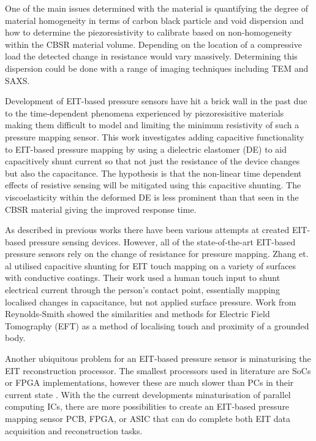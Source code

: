One of the main issues determined with the material is quantifying the degree of material homogeneity in terms of carbon black particle and void dispersion and how to determine the piezoresistivity to calibrate based on non-homogeneity within the CBSR material volume. Depending on the location of a compressive load the detected change in resistance would vary massively. Determining this dispersion could be done with a range of imaging techniques including TEM and SAXS.

Development of EIT-based pressure sensors have hit a brick wall in the past due to the time-dependent phenomena experienced by piezoresisitive materials making them difficult to model and limiting the minimum resistivity of such a pressure mapping sensor. This work investigates adding capacitive functionality to EIT-based pressure mapping by using a dielectric elastomer (DE) to aid capacitively shunt current so that not just the resistance of the device changes but also the capacitance. The hypothesis is that the non-linear time dependent effects of resistive sensing will be mitigated using this capacitive shunting. The viscoelasticity within the deformed DE is less prominent than that seen in the CBSR material giving the improved response time.

As described in previous works \cite{Ellingham2024} there have been various attempts at created EIT-based pressure sensing devices. However, all of the state-of-the-art EIT-based pressure sensors rely on the change of resistance for pressure mapping. Zhang et. al \cite{Zhang2017} utilised capacitive shunting for EIT touch mapping on a variety of surfaces with conductive coatings. Their work used a human touch input to shunt electrical current through the person's contact point, essentially mapping localised changes in capacitance, but not applied surface pressure. Work from Reynolds-Smith \cite{Reynoldssmith1995,Reynoldssmith1999} showed the similarities and methods for Electric Field Tomography (EFT) as a method of localising touch and proximity of a grounded body. 

Another ubiquitous problem for an EIT-based pressure sensor is minaturising the EIT reconstruction processor. The smallest processors used in literature are SoCs or FPGA implementations, however these are much slower than PCs in their current state \cite{ZamoraArellano2020,Kim2017,Takhti2019,Liu2019}. With the the current developments minaturisation of parallel computing ICs, there are more possibilities to create an EIT-based pressure mapping sensor PCB, FPGA, or ASIC that can do complete both EIT data acquisition and reconstruction tasks.

